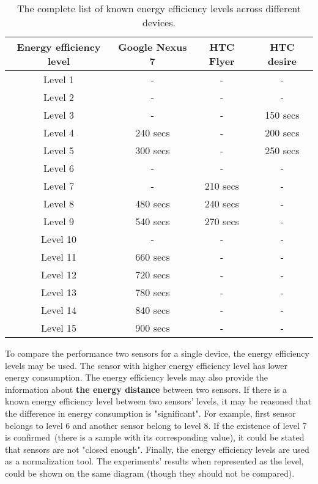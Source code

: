 	
\begin{table}[H]
\centering
    \begin{tabular}{| c | c | c | c |}
    \hline
      Energy efficiency level & Google Nexus 7 & HTC Flyer & HTC desire \\ \hline
    Level 1 & -& - &  -\\ \hline
  	Level 2 & - & - & -\\ \hline
  	Level 3 & - & - & 150 secs\\ \hline
    Level 4 & 240 secs & - & 200 secs\\ \hline
    Level 5 & 300 secs & - & 250 secs \\ \hline
    Level 6 & - & - & - \\\hline
    Level 7 & - & 210 secs & - \\ \hline
    Level 8 & 480 secs & 240  secs & - \\ \hline
    Level 9 & 540 secs & 270 secs & - \\ \hline
    Level 10 & - & - & - \\ \hline
    Level 11 & 660 secs & - & - \\ \hline
    Level 12 & 720 secs & - & -\\ \hline
    Level 13 & 780 secs & - & - \\ \hline
    Level 14 & 840 secs & - & -\\ \hline
    Level 15 & 900 secs & -& -\\ \hline
    \end{tabular}
    \caption{The complete list of known energy efficiency levels across different devices.}
	\label{table:energy_efficiency_levels}
\end{table}
	
To compare the performance two sensors for a single device, the energy efficiency levels may be used. The sensor with higher energy efficiency level has lower energy consumption. The energy efficiency levels may also provide the information about \textbf{the energy distance} between two sensors. If there is a known energy efficiency level between two sensors' levels, it may be reasoned that the difference in energy consumption is "significant". For example, first sensor belongs to level 6 and another sensor belong to level 8. If the existence of level 7 is confirmed\ (there is a sample with its corresponding value), it could be stated that sensors are not "closed enough". Finally, the energy efficiency levels are used as a normalization tool. The experiments' results when represented as the level, could be shown on the same diagram (though they should not be compared). 
   
